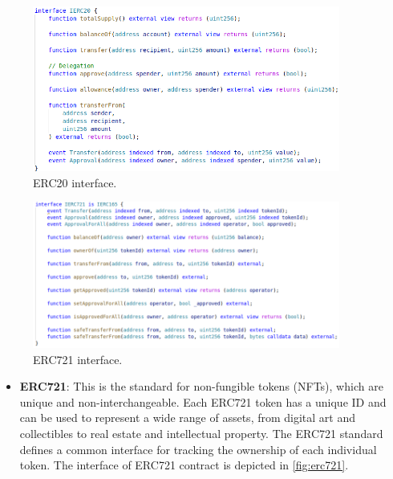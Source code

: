 \begin{figure}[t]
	\begin{center}
		\includegraphics[width=0.9\textwidth]{./figs/ERC20.png}
		\caption{ERC20 interface.}		
		\label{fig:erc20}
	\end{center}	
\end{figure}
\begin{figure}
	\begin{center}
		\includegraphics[width=0.9\textwidth]{./figs/ERC721.png}
		\caption{ERC721 interface.}		
		\label{fig:erc721}
	\end{center}	
\end{figure}


\begin{itemize}
	\tightlist
	\item
	\textbf{ERC721}: This is the standard for non-fungible tokens (NFTs),
	which are unique and non-interchangeable. Each ERC721 token has a
	unique ID and can be used to represent a wide range of assets, from
	digital art and collectibles to real estate and intellectual property.
	The ERC721 standard defines a common interface for tracking the
	ownership of each individual token.
	The interface of ERC721 contract is depicted in \autoref{fig:erc721}.
\end{itemize}




